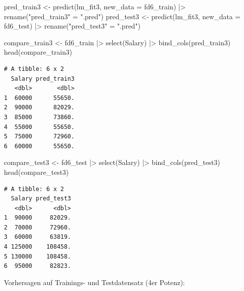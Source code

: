 \documentclass[
  letterpaper,
  DIV=11,
  numbers=noendperiod]{scrartcl}
\newenvironment{Shaded}{\begin{snugshade}}{\end{snugshade}}
\newcommand{\AttributeTok}[1]{\textcolor[rgb]{0.40,0.45,0.13}{#1}}
\newcommand{\FunctionTok}[1]{\textcolor[rgb]{0.28,0.35,0.67}{#1}}
\newcommand{\NormalTok}[1]{\textcolor[rgb]{0.00,0.23,0.31}{#1}}
\newcommand{\OtherTok}[1]{\textcolor[rgb]{0.00,0.23,0.31}{#1}}
\newcommand{\SpecialCharTok}[1]{\textcolor[rgb]{0.37,0.37,0.37}{#1}}
\newcommand{\StringTok}[1]{\textcolor[rgb]{0.13,0.47,0.30}{#1}}
\begin{document}
\begin{Shaded}
\begin{Highlighting}[]
\NormalTok{pred\_train3 }\OtherTok{\textless{}{-}} \FunctionTok{predict}\NormalTok{(lm\_fit3, }\AttributeTok{new\_data =}\NormalTok{ fd6\_train) }\SpecialCharTok{|\textgreater{}} \FunctionTok{rename}\NormalTok{(}\StringTok{"pred\_train3"} \OtherTok{=} \StringTok{".pred"}\NormalTok{)}
\NormalTok{pred\_test3 }\OtherTok{\textless{}{-}} \FunctionTok{predict}\NormalTok{(lm\_fit3, }\AttributeTok{new\_data =}\NormalTok{ fd6\_test) }\SpecialCharTok{|\textgreater{}}  \FunctionTok{rename}\NormalTok{(}\StringTok{"pred\_test3"} \OtherTok{=} \StringTok{".pred"}\NormalTok{)}

\NormalTok{compare\_train3 }\OtherTok{\textless{}{-}}\NormalTok{ fd6\_train }\SpecialCharTok{|\textgreater{}} 
  \FunctionTok{select}\NormalTok{(Salary) }\SpecialCharTok{|\textgreater{}} 
  \FunctionTok{bind\_cols}\NormalTok{(pred\_train3)}
\FunctionTok{head}\NormalTok{(compare\_train3)}
\end{Highlighting}
\end{Shaded}

\begin{verbatim}
# A tibble: 6 x 2
  Salary pred_train3
   <dbl>       <dbl>
1  60000      55650.
2  90000      82029.
3  85000      73860.
4  55000      55650.
5  75000      72960.
6  60000      55650.
\end{verbatim}

\begin{Shaded}
\begin{Highlighting}[]
\NormalTok{compare\_test3 }\OtherTok{\textless{}{-}}\NormalTok{ fd6\_test }\SpecialCharTok{|\textgreater{}} 
  \FunctionTok{select}\NormalTok{(Salary) }\SpecialCharTok{|\textgreater{}} 
  \FunctionTok{bind\_cols}\NormalTok{(pred\_test3)}
\FunctionTok{head}\NormalTok{(compare\_test3)}
\end{Highlighting}
\end{Shaded}

\begin{verbatim}
# A tibble: 6 x 2
  Salary pred_test3
   <dbl>      <dbl>
1  90000     82029.
2  70000     72960.
3  60000     63819.
4 125000    108458.
5 130000    108458.
6  95000     82823.
\end{verbatim}

Vorhersagen auf Trainings- und Testdatensatz (4er Potenz):
\end{document}
